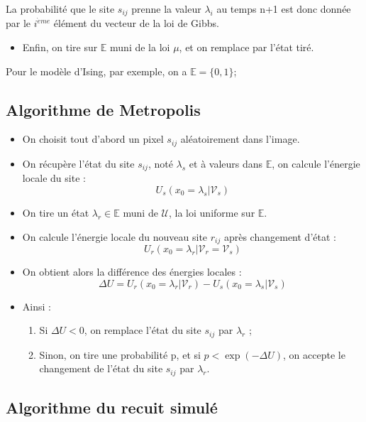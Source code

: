 \documentclass[a4paper, 12pt]{article}
\begin{document}
La probabilité que le site $s_{ij}$ prenne la valeur $\lambda_i$ au temps n+1 est donc donnée par le $i^{\grave{e}me}$ élément du vecteur de la loi de Gibbs.
\begin{itemize}
\item Enfin, on tire sur $\mathbb{E}$ muni de la loi $\mu$, et on remplace par l'état tiré.
\end{itemize}

Pour le modèle d'Ising, par exemple, on a $\mathbb{E} =\{0,1\}$;

\subsection[Algorithme de Metropolis]{Algorithme de Metropolis}
\begin{itemize}
\item On choisit tout d'abord un pixel $s_{ij} $ aléatoirement dans l'image.
\item On récupère l'état du site $s_{ij} $, noté $\lambda_s$ et à valeurs dans $\mathbb{E}$, on calcule l'énergie locale du site : 
\[
  U_s(x_0=\lambda_s| \mathcal{V}_s)
\]
\item On tire un état $\lambda_r \in \mathbb{E}$ muni de $\mathcal{U}$, la loi uniforme sur $\mathbb{E}$.
\item On calcule l'énergie locale du nouveau site $r_{ij}$ après changement d'état : 
\[
  U_r(x_0=\lambda_r| \mathcal{V}_r = \mathcal{V}_s) 
\]
\item On obtient alors la différence des énergies locales : 
\[
  \Delta U = U_r(x_0=\lambda_r| \mathcal{V}_r)-U_s(x_0=\lambda_s| \mathcal{V}_s)
\]
\item Ainsi : 
\begin{enumerate}
  \item Si $\Delta U < 0$, on remplace l'état du site $s_{ij}$ par $\lambda_r$ ;
  \item Sinon, on tire une probabilité p, et si $p < \exp({-\Delta U })$, on accepte le changement de l'état du site $s_{ij}$ par $\lambda_r$.
\end{enumerate}
\end{itemize}

\subsection[Algorithme du recuit simulé]{Algorithme du recuit simulé}
\end{document}
